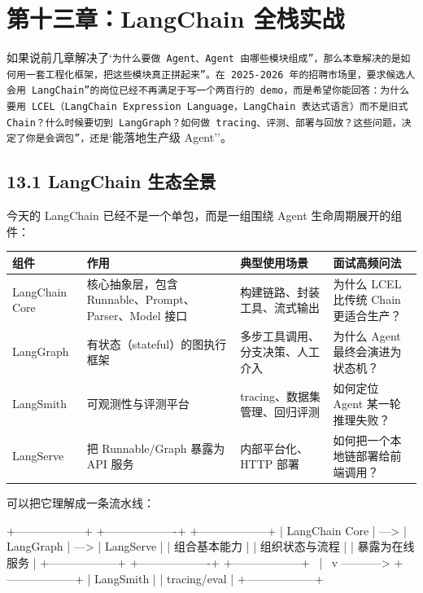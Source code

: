 \chapter{第十三章：LangChain 全栈实战}

如果说前几章解决了`\texttt{为什么要做 Agent、Agent 由哪些模块组成''，那么本章解决的是}\texttt{如何用一套工程化框架，把这些模块真正拼起来''。在 2025-2026 年的招聘市场里，要求候选人}\texttt{会用 LangChain''的岗位已经不再满足于写一个两百行的 demo，而是希望你能回答：为什么要用 LCEL（LangChain Expression Language，LangChain 表达式语言）而不是旧式 Chain？什么时候要切到 LangGraph？如何做 tracing、评测、部署与回放？这些问题，决定了你是}\texttt{会调包''，还是}`能落地生产级 Agent''。


\section{13.1 LangChain 生态全景}

今天的 LangChain 已经不是一个单包，而是一组围绕 Agent 生命周期展开的组件：


\begingroup
\scriptsize
\setlength{\tabcolsep}{3pt}
\begin{longtable}{|p{}|p{}|p{}|p{}|}
\hline
组件 & 作用 & 典型使用场景 & 面试高频问法 \\ \hline
LangChain Core & 核心抽象层，包含 Runnable、Prompt、Parser、Model 接口 & 构建链路、封装工具、流式输出 & 为什么 LCEL 比传统 Chain 更适合生产？ \\ \hline
LangGraph & 有状态（stateful）的图执行框架 & 多步工具调用、分支决策、人工介入 & 为什么 Agent 最终会演进为状态机？ \\ \hline
LangSmith & 可观测性与评测平台 & tracing、数据集管理、回归评测 & 如何定位 Agent 某一轮推理失败？ \\ \hline
LangServe & 把 Runnable/Graph 暴露为 API 服务 & 内部平台化、HTTP 部署 & 如何把一个本地链部署给前端调用？ \\ \hline
\end{longtable}
\endgroup

可以把它理解成一条流水线：


\begin{codeblock}
+------------------+      +-------------------+      +------------------+
| LangChain Core   | ---> | LangGraph         | ---> | LangServe        |
| 组合基本能力      |      | 组织状态与流程      |      | 暴露为在线服务      |
+------------------+      +-------------------+      +------------------+
           \                         |
            \                        v
             \------------> +------------------+
                             | LangSmith        |
                             | tracing/eval     |
                             +------------------+
\end{codeblock}

